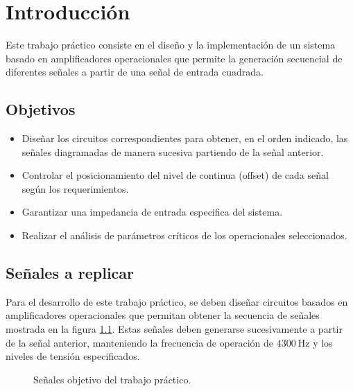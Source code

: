 \chapter{Introducción}
\label{chap:introduccion}

Este trabajo práctico consiste en el diseño y la implementación de un sistema basado en amplificadores operacionales que
permite la generación secuencial de diferentes señales a partir de una señal de entrada cuadrada.

\section{Objetivos}
\begin{itemize}
    \item Diseñar los circuitos correspondientes para obtener, en el orden indicado, las señales diagramadas de manera
        sucesiva partiendo de la señal anterior.
    \item Controlar el posicionamiento del nivel de continua (offset) de cada señal según los requerimientos.
    \item Garantizar una impedancia de entrada especifica del sistema.
    \item Realizar el análisis de parámetros críticos de los operacionales seleccionados.
\end{itemize}

\section{Señales a replicar}
Para el desarrollo de este trabajo práctico, se deben diseñar circuitos basados en amplificadores operacionales que
permitan obtener la secuencia de señales mostrada en la figura \ref{fig:senales_objetivo}. Estas señales deben generarse
sucesivamente a partir de la señal anterior, manteniendo la frecuencia de operación de $\SI{4300}{\Hz}$ y los niveles de
tensión especificados.

\begin{figure}[!ht]
    \centering
    
    \caption{Señales objetivo del trabajo práctico.}
    \label{fig:senales_objetivo}
\end{figure}
